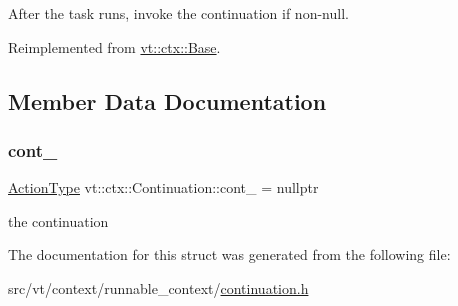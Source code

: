 After the task runs, invoke the continuation if non-\/null. 



Reimplemented from \hyperlink{structvt_1_1ctx_1_1_base_a113bac732b2831caa8eed11609ccaf0e}{vt\+::ctx\+::\+Base}.



\subsection{Member Data Documentation}
\mbox{\label{structvt_1_1ctx_1_1_continuation_aadaa0a147af8e8bba30684a098a5eb39}} 
\subsubsection{\texorpdfstring{cont\+\_\+}{cont\_}}
{\footnotesize\ttfamily \hyperlink{namespacevt_ae0a5a7b18cc99d7b732cb4d44f46b0f3}{Action\+Type} vt\+::ctx\+::\+Continuation\+::cont\+\_\+ = nullptr\hspace{0.3cm}{\ttfamily [private]}}

the continuation 

The documentation for this struct was generated from the following file\+:\begin{DoxyCompactItemize}
\item 
src/vt/context/runnable\+\_\+context/\hyperlink{continuation_8h}{continuation.\+h}\end{DoxyCompactItemize}
